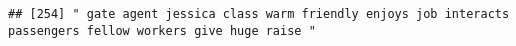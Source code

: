 \documentclass[
]{article}
\begin{document}
\begin{verbatim}
## [254] " gate agent jessica class warm friendly enjoys job interacts passengers fellow workers give huge raise "                                                                                                                                                                                                                                                                                                                                                                                                                                                                                                                                                                                                                                                                                                                                                                                                                                                                                                                                                                                                                                                                                                                                                                                                                                                                                                                                                                                                                                                                                                                                                                                                                                                                                       

\end{verbatim}
\end{document}

